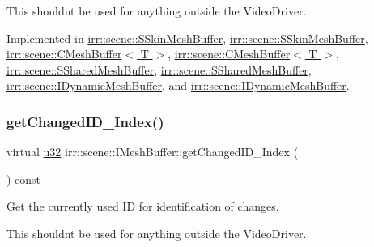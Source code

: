 This shouldn\textquotesingle{}t be used for anything outside the Video\+Driver. 

Implemented in \hyperlink{structirr_1_1scene_1_1SSkinMeshBuffer_a60b444cfe4b0cec6d2cc4bdf7958dd16}{irr\+::scene\+::\+S\+Skin\+Mesh\+Buffer}, \hyperlink{structirr_1_1scene_1_1SSkinMeshBuffer_a60b444cfe4b0cec6d2cc4bdf7958dd16}{irr\+::scene\+::\+S\+Skin\+Mesh\+Buffer}, \hyperlink{classirr_1_1scene_1_1CMeshBuffer_aec6786022abd81ddf8d4e79a23628944}{irr\+::scene\+::\+C\+Mesh\+Buffer$<$ T $>$}, \hyperlink{classirr_1_1scene_1_1CMeshBuffer_aec6786022abd81ddf8d4e79a23628944}{irr\+::scene\+::\+C\+Mesh\+Buffer$<$ T $>$}, \hyperlink{structirr_1_1scene_1_1SSharedMeshBuffer_a0a37d52f7ec9917d9ca0d9dd908917b9}{irr\+::scene\+::\+S\+Shared\+Mesh\+Buffer}, \hyperlink{structirr_1_1scene_1_1SSharedMeshBuffer_a0a37d52f7ec9917d9ca0d9dd908917b9}{irr\+::scene\+::\+S\+Shared\+Mesh\+Buffer}, \hyperlink{classirr_1_1scene_1_1IDynamicMeshBuffer_a2514a3d0e4865b7b9714fe1f9f58ad51}{irr\+::scene\+::\+I\+Dynamic\+Mesh\+Buffer}, and \hyperlink{classirr_1_1scene_1_1IDynamicMeshBuffer_a2514a3d0e4865b7b9714fe1f9f58ad51}{irr\+::scene\+::\+I\+Dynamic\+Mesh\+Buffer}.

\mbox{\label{classirr_1_1scene_1_1IMeshBuffer_acc389d76856dfb06c3ba45a92315e6d8}} 
\subsubsection{\texorpdfstring{get\+Changed\+I\+D\+\_\+\+Index()}{getChangedID\_Index()}\hspace{0.1cm}{\footnotesize\ttfamily [2/2]}}
{\footnotesize\ttfamily virtual \hyperlink{namespaceirr_a0416a53257075833e7002efd0a18e804}{u32} irr\+::scene\+::\+I\+Mesh\+Buffer\+::get\+Changed\+I\+D\+\_\+\+Index (\begin{DoxyParamCaption}{ }\end{DoxyParamCaption}) const\hspace{0.3cm}{\ttfamily [pure virtual]}}



Get the currently used ID for identification of changes. 

This shouldn\textquotesingle{}t be used for anything outside the Video\+Driver. 

